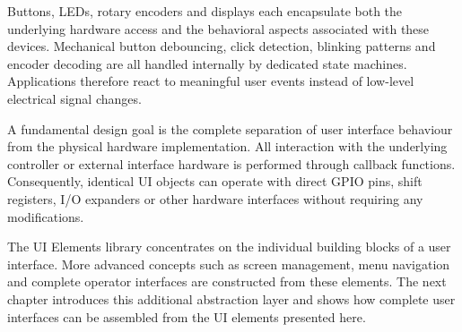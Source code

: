Buttons, LEDs, rotary encoders and displays each encapsulate both the underlying
hardware access and the behavioral aspects associated with these devices.
Mechanical button debouncing, click detection, blinking patterns and encoder
decoding are all handled internally by dedicated state machines. Applications
therefore react to meaningful user events instead of low-level electrical signal
changes.

A fundamental design goal is the complete separation of user interface behaviour
from the physical hardware implementation. All interaction with the underlying
controller or external interface hardware is performed through callback
functions. Consequently, identical UI objects can operate with direct GPIO pins,
shift registers, I/O expanders or other hardware interfaces without requiring
any modifications.

The UI Elements library concentrates on the individual building
blocks of a user interface. More advanced concepts such as screen management,
menu navigation and complete operator interfaces are constructed from these
elements. The next chapter introduces this additional abstraction layer and
shows how complete user interfaces can be assembled from the UI elements
presented here.
